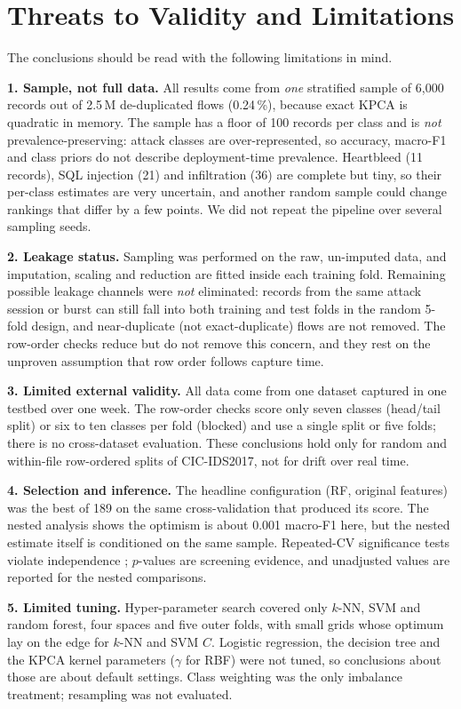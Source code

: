 \documentclass[runningheads]{llncs}
\begin{document}
\section{Threats to Validity and Limitations}
The conclusions should be read with the following limitations in mind.

\textbf{1. Sample, not full data.} All results come from \emph{one} stratified sample of 6{,}000 records out of 2.5\,M de-duplicated flows (0.24\,\%), because exact KPCA is quadratic in memory. The sample has a floor of 100 records per class and is \emph{not} prevalence-preserving: attack classes are over-represented, so accuracy, macro-F1 and class priors do not describe deployment-time prevalence. Heartbleed (11 records), SQL injection (21) and infiltration (36) are complete but tiny, so their per-class estimates are very uncertain, and another random sample could change rankings that differ by a few points. We did not repeat the pipeline over several sampling seeds.

\textbf{2. Leakage status.} Sampling was performed on the raw, un-imputed data, and imputation, scaling and reduction are fitted inside each training fold. Remaining possible leakage channels were \emph{not} eliminated: records from the same attack session or burst can still fall into both training and test folds in the random 5-fold design, and near-duplicate (not exact-duplicate) flows are not removed. The row-order checks reduce but do not remove this concern, and they rest on the unproven assumption that row order follows capture time.

\textbf{3. Limited external validity.} All data come from one dataset captured in one testbed over one week. The row-order checks score only seven classes (head/tail split) or six to ten classes per fold (blocked) and use a single split or five folds; there is no cross-dataset evaluation. These conclusions hold only for random and within-file row-ordered splits of CIC-IDS2017, not for drift over real time.

\textbf{4. Selection and inference.} The headline configuration (RF, original features) was the best of 189 on the same cross-validation that produced its score. The nested analysis shows the optimism is about 0.001 macro-F1 here, but the nested estimate itself is conditioned on the same sample. Repeated-CV significance tests violate independence \cite{nadeau2003}; $p$-values are screening evidence, and unadjusted values are reported for the nested comparisons.

\textbf{5. Limited tuning.} Hyper-parameter search covered only $k$-NN, SVM and random forest, four spaces and five outer folds, with small grids whose optimum lay on the edge for $k$-NN and SVM $C$. Logistic regression, the decision tree and the KPCA kernel parameters ($\gamma$ for RBF) were not tuned, so conclusions about those are about default settings. Class weighting was the only imbalance treatment; resampling was not evaluated.
\end{document}
